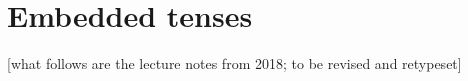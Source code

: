 \chapter{Embedded tenses}\label{cha:embedded-tenses}

[what follows are the lecture notes from 2018; to be revised and retypeset]



